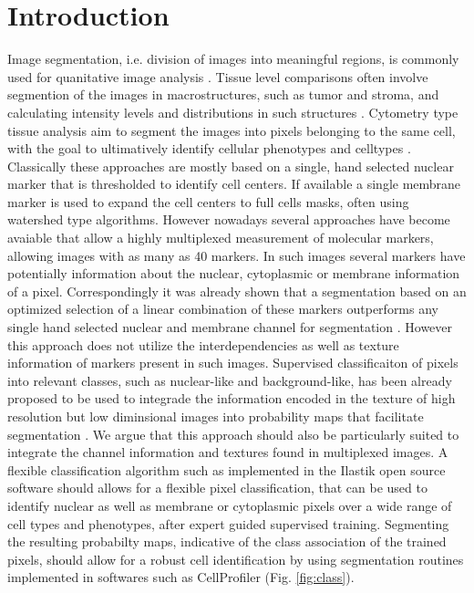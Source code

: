 \documentclass[a4paper]{article}
\begin{document}
\section{Introduction}
Image segmentation, i.e. division of images into meaningful regions, is
commonly  used for quanitative image analysis
\cite{carpenter_cellprofiler:_2006,mccabe_automated_2005}.  Tissue level comparisons often
involve segmention of the images in macrostructures, such as tumor and stroma, and calculating
intensity levels and distributions in such structures \cite{mccabe_automated_2005}.  Cytometry type tissue analysis aim to
segment the images into pixels belonging to the same cell, with the goal to ultimatively identify
cellular phenotypes and celltypes \cite{carpenter_cellprofiler:_2006}.  Classically these approaches are mostly based on a single, hand
selected nuclear marker that is thresholded to identify cell centers. If available a single membrane
marker is used to expand the cell centers to full cells masks, often using watershed type algorithms.  However
nowadays several approaches have become avaiable that allow a highly multiplexed measurement of
molecular markers, allowing images with as many as 40 markers. In such images several markers have
potentially information about the nuclear, cytoplasmic or membrane information of a pixel.  Correspondingly it
was already shown that a segmentation based on an optimized selection of a linear combination of
these markers outperforms any single hand selected nuclear and membrane channel for segmentation
\cite{schuffler_single_2014}. However this approach does not utilize the interdependencies as well as texture
information of markers present in such images. Supervised classificaiton of pixels into relevant classes, such as
nuclear-like and background-like, has been already proposed to be used to integrade the information
encoded in the texture of high resolution but low diminsional images into probability maps that facilitate segmentation
\cite{joyseeree_using_2013,sommer_learning-based_2012-1,logan_quantifying_2016, sommer_ilastik:_2011}.
We argue that this approach should also be particularly suited to
integrate the channel information and textures found in multiplexed images. A flexible classification algorithm such as implemented in the Ilastik open source software should allows for a
flexible pixel classification, that can be used to identify nuclear as well as membrane or
cytoplasmic pixels over a wide range of cell types and phenotypes, after expert guided supervised
training. Segmenting the resulting probabilty maps, indicative of the class association of the
trained pixels, should allow for a robust cell identification by using segmentation routines
implemented in softwares such as CellProfiler (Fig. \ref{fig:class}).
\end{document}
